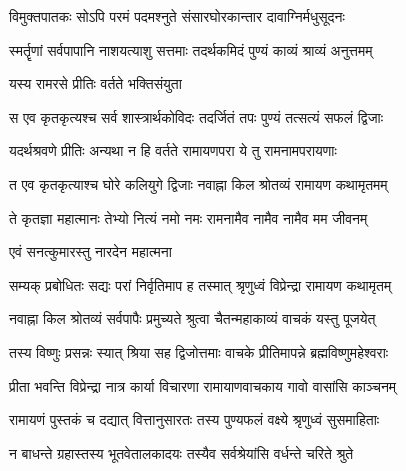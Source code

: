  

\twolineshloka
{विमुक्तपातकः सोऽपि परमं पदमश्नुते}
{संसारघोरकान्तार दावाग्निर्मधुसूदनः}%

 

\twolineshloka
{स्मर्तॄणां सर्वपापानि नाशयत्याशु सत्तमाः}
{तदर्थकमिदं पुण्यं काव्यं श्राव्यं अनुत्तमम्}%

 

\onelineshloka
{यस्य रामरसे प्रीतिः वर्तते भक्तिसंयुता}%

 

\twolineshloka
{स एव कृतकृत्यश्च सर्व शास्त्रार्थकोविदः}
{तदर्जितं तपः पुण्यं तत्सत्यं सफलं द्विजाः}%

 

\twolineshloka
{यदर्थश्रवणे प्रीतिः अन्यथा न हि वर्तते}
{रामायणपरा ये तु रामनामपरायणाः}%

 

\twolineshloka
{त एव कृतकृत्याश्च घोरे कलियुगे द्विजाः}
{नवाह्ना किल श्रोतव्यं रामायण कथामृतमम्}%

 

\twolineshloka
{ते कृतज्ञा महात्मानः तेभ्यो नित्यं नमो नमः}
{रामनामैव नामैव नामैव मम जीवनम्}%

 


\onelineshloka
{एवं सनत्कुमारस्तु नारदेन महात्मना}%

 

\twolineshloka
{सम्यक् प्रबोधितः सद्यः परां निर्वृतिमाप ह}
{तस्मात् श्रृणुध्वं विप्रेन्द्रा रामायण कथामृतम्}%

 

\twolineshloka
{नवाह्ना किल श्रोतव्यं सर्वपापैः प्रमुच्यते}
{श्रुत्वा चैतन्महाकाव्यं वाचकं यस्तु पूजयेत्}%

 

\twolineshloka
{तस्य विष्णुः प्रसन्नः स्यात् श्रिया सह द्विजोत्तमाः}
{वाचके प्रीतिमापन्ने ब्रह्मविष्णुमहेश्वराः}%

 

\twolineshloka
{प्रीता भवन्ति विप्रेन्द्रा नात्र कार्या विचारणा}
{रामायाणवाचकाय गावो वासांसि काञ्चनम्}%

 

\twolineshloka
{रामायणं पुस्तकं च दद्यात् वित्तानुसारतः}
{तस्य पुण्यफलं वक्ष्ये श्रृणुध्वं सुसमाहिताः}%

 

\twolineshloka
{न बाधन्ते ग्रहास्तस्य भूतवेतालकादयः}
{तस्यैव सर्वश्रेयांसि वर्धन्ते चरिते श्रुते}%

